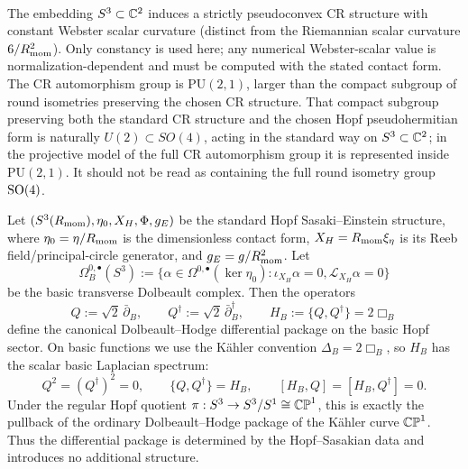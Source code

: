 \documentclass[11pt]{article}
\begin{document}
\begin{remark}[CR Structure]
\mbox{}\\[6pt] 
\label{p1:rem:cr-structure}
The embedding \(S^3 \subset \mathbb{C}^2\) induces a strictly pseudoconvex CR structure 
with constant Webster scalar curvature (distinct from the Riemannian scalar 
curvature \(6/R_{\mathrm{mom}}^2\)). Only constancy is used here; any numerical Webster-scalar value is normalization-dependent and must be computed with the stated contact form. The CR automorphism group is \(\mathrm{PU}(2,1)\), larger than the compact subgroup of round isometries preserving the chosen CR structure. That compact subgroup preserving both the standard CR structure and the chosen Hopf pseudohermitian form is naturally \(U(2)\subset SO(4)\), acting in the standard way on \(S^3\subset\mathbb{C}^2\); in the projective model of the full CR automorphism group it is represented inside \(\mathrm{PU}(2,1)\). It should not be read as containing the full round isometry group \(\mathrm{SO}(4)\). 
\end{remark}


\begin{theorem}
\label{p1:thm:hopf-sasakian-dolbeault-hodge}
Let \((S^3(R_{\mathrm{mom}}),\eta_0,X_H,\Phi,g_E)\) be the standard Hopf Sasaki--Einstein
structure, where \(\eta_0=\eta/R_{\mathrm{mom}}\) is the dimensionless contact form,
\(X_H=R_{\mathrm{mom}}\xi_\eta\) is its Reeb field/principal-circle generator, and
\(g_E=g/R_{\mathrm{mom}}^2\). Let
\[
\Omega^{0,\bullet}_B(S^3)
:=
\{\alpha\in\Omega^{0,\bullet}(\ker\eta_0):\iota_{X_H}\alpha=0,
\mathcal L_{X_H}\alpha=0\}
\]
be the basic transverse Dolbeault complex. Then the operators
\[
Q:=\sqrt{2}\,\bar\partial_B,
\qquad
Q^\dagger:=\sqrt{2}\,\bar\partial_B^\dagger,
\qquad
H_B:=\{Q,Q^\dagger\}=2\Box_B
\]
define the canonical Dolbeault--Hodge differential package on the
basic Hopf sector.  On basic functions we use the K\"ahler convention \(\Delta_B=2\Box_B\), so \(H_B\) has the scalar basic Laplacian spectrum:
\[
Q^2=(Q^\dagger)^2=0,
\qquad
\{Q,Q^\dagger\}=H_B,
\qquad
[H_B,Q]=[H_B,Q^\dagger]=0.
\]
Under the regular Hopf quotient \(\pi:S^3\to S^3/S^1\cong\mathbb{CP}^1\), this is exactly
the pullback of the ordinary Dolbeault--Hodge package of the K\"ahler curve
\(\mathbb{CP}^1\). Thus the differential package is determined by the Hopf--Sasakian data and
introduces no additional structure.
\end{theorem}
\end{document}

